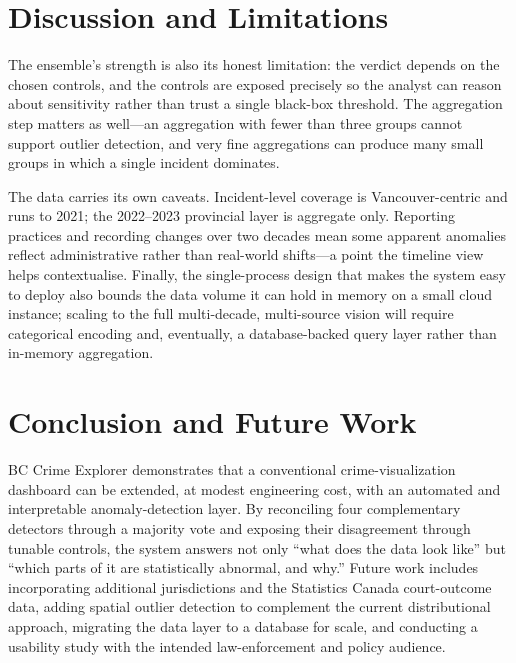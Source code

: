 \documentclass[conference]{IEEEtran}
\begin{document}
\section{Discussion and Limitations}
The ensemble's strength is also its honest limitation: the verdict depends on the chosen controls, and the controls are exposed precisely so the analyst can reason about sensitivity rather than trust a single black-box threshold. The aggregation step matters as well---an aggregation with fewer than three groups cannot support outlier detection, and very fine aggregations can produce many small groups in which a single incident dominates.

The data carries its own caveats. Incident-level coverage is Vancouver-centric and runs to 2021; the 2022--2023 provincial layer is aggregate only. Reporting practices and recording changes over two decades mean some apparent anomalies reflect administrative rather than real-world shifts---a point the timeline view helps contextualise. Finally, the single-process design that makes the system easy to deploy also bounds the data volume it can hold in memory on a small cloud instance; scaling to the full multi-decade, multi-source vision will require categorical encoding and, eventually, a database-backed query layer rather than in-memory aggregation.

\section{Conclusion and Future Work}
BC Crime Explorer demonstrates that a conventional crime-visualization dashboard can be extended, at modest engineering cost, with an automated and interpretable anomaly-detection layer. By reconciling four complementary detectors through a majority vote and exposing their disagreement through tunable controls, the system answers not only ``what does the data look like'' but ``which parts of it are statistically abnormal, and why.'' Future work includes incorporating additional jurisdictions and the Statistics Canada court-outcome data, adding spatial outlier detection to complement the current distributional approach, migrating the data layer to a database for scale, and conducting a usability study with the intended law-enforcement and policy audience.
\end{document}

